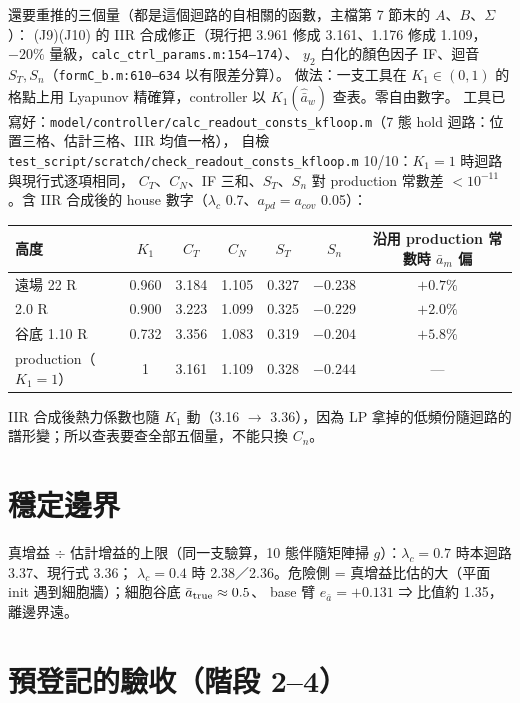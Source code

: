 \documentclass[11pt,a4paper]{ctexart}
\newcommand{\ba}{\bar{a}}
\newcommand{\ah}{\hat{\ba}_w}
\newcommand{\lc}{\lambda_c}
\begin{document}
還要重推的三個量（都是這個迴路的自相關的函數，主檔第 7 節末的 $A$、$B$、$\Sigma$）：
(J9)(J10) 的 IIR 合成修正（現行把 3.961 修成 3.161、1.176 修成 1.109，$-20\%$ 量級，\texttt{calc\_ctrl\_params.m:154--174}）、
$y_2$ 白化的顏色因子 IF、迴音 $S_T, S_n$（\texttt{formC\_b.m:610--634} 以有限差分算）。
做法：一支工具在 $K_1 \in (0,1)$ 的格點上用 Lyapunov 精確算，controller 以 $K_1(\ah)$ 查表。零自由數字。
工具已寫好：\texttt{model/controller/calc\_readout\_consts\_kfloop.m}（7 態 hold 迴路：位置三格、估計三格、IIR 均值一格），
自檢 \texttt{test\_script/scratch/check\_readout\_consts\_kfloop.m} 10/10：$K_1 = 1$ 時迴路與現行式逐項相同，
$C_T$、$C_N$、IF 三和、$S_T$、$S_n$ 對 production 常數差 $< 10^{-11}$。含 IIR 合成後的 house 數字（$\lc$ 0.7、$a_{pd} = a_{cov}$ 0.05）：

\begin{tabular}{@{}lcccccc@{}}
\toprule
高度 & $K_1$ & $C_T$ & $C_N$ & $S_T$ & $S_n$ & 沿用 production 常數時 $\ba_m$ 偏 \\
\midrule
遠場 22 R & 0.960 & 3.184 & 1.105 & 0.327 & $-0.238$ & $+0.7\%$ \\
2.0 R & 0.900 & 3.223 & 1.099 & 0.325 & $-0.229$ & $+2.0\%$ \\
谷底 1.10 R & 0.732 & 3.356 & 1.083 & 0.319 & $-0.204$ & $+5.8\%$ \\
production（$K_1 = 1$） & 1 & 3.161 & 1.109 & 0.328 & $-0.244$ & — \\
\bottomrule
\end{tabular}

IIR 合成後熱力係數也隨 $K_1$ 動（3.16 $\to$ 3.36），因為 LP 拿掉的低頻份隨迴路的譜形變；所以查表要查全部五個量，不能只換 $C_n$。

\section{穩定邊界}

真增益 $\div$ 估計增益的上限（同一支驗算，10 態伴隨矩陣掃 $g$）：$\lc = 0.7$ 時本迴路 3.37、現行式 3.36；
$\lc = 0.4$ 時 2.38／2.36。危險側 = 真增益比估的大（平面 init 遇到細胞牆）；細胞谷底 $\ba_{\rm true} \approx 0.5$、
base 臂 $e_{\ba} = +0.131$ ⇒ 比值約 1.35，離邊界遠。

\section{預登記的驗收（階段 2--4）}
\end{document}
